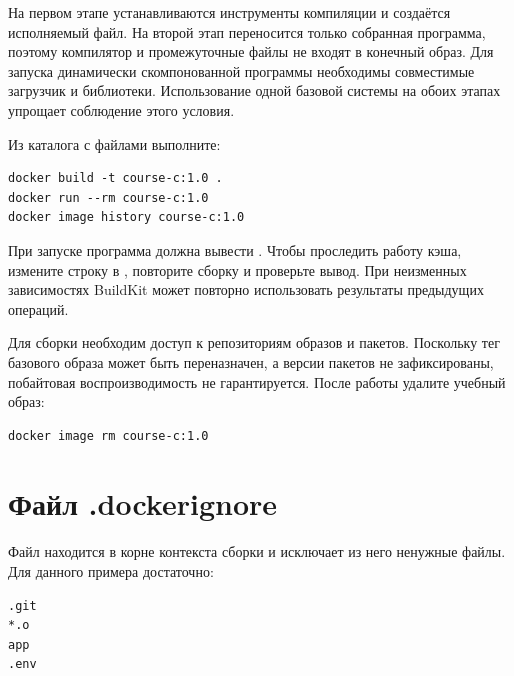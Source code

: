 \par\pagebreak[4]
На первом этапе устанавливаются инструменты компиляции и создаётся исполняемый файл. На второй этап переносится только собранная программа, поэтому компилятор и промежуточные файлы не входят в конечный образ. Для запуска динамически скомпонованной программы необходимы совместимые загрузчик и библиотеки. Использование одной базовой системы на обоих этапах упрощает соблюдение этого условия.

\par\addvspace{10pt}\noindent\begin{minipage}{\linewidth}
\setlength{\parindent}{0pt}\noindent\hspace*{1.25cm}Из каталога с файлами выполните:\par\kern 10pt
\begin{verbatim}
docker build -t course-c:1.0 .
docker run --rm course-c:1.0
docker image history course-c:1.0
\end{verbatim}
\end{minipage}\par\addvspace{10pt}

При запуске программа должна вывести . Чтобы проследить работу кэша, измените строку в , повторите сборку и проверьте вывод. При неизменных зависимостях BuildKit может повторно использовать результаты предыдущих операций.

Для сборки необходим доступ к репозиториям образов и пакетов. Поскольку тег базового образа может быть переназначен, а версии пакетов не зафиксированы, побайтовая воспроизводимость не гарантируется. После работы удалите учебный образ:
\par\addvspace{10pt}\noindent\begin{minipage}{\linewidth}
\begin{verbatim}
docker image rm course-c:1.0
\end{verbatim}
\end{minipage}\par\addvspace{10pt}

\section{Файл .dockerignore}

\par\addvspace{10pt}\noindent\begin{minipage}{\linewidth}
\setlength{\parindent}{0pt}\noindent\hspace*{1.25cm}Файл  находится в корне контекста сборки и исключает из него ненужные файлы. Для данного примера достаточно:\par\kern 10pt
\begin{verbatim}
.git
*.o
app
.env
\end{verbatim}
\end{minipage}\par\nobreak\addvspace{10pt}\nobreak


